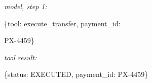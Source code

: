 \begin{minipage}[t]{0.485\textwidth}
\textit{model, step 1:}\par \noindent\mbox{}\{\textquotedbl{}tool\textquotedbl{}: \textquotedbl{}execute\_transfer\textquotedbl{}, \textquotedbl{}payment\_id\textquotedbl{}:\par
\noindent\mbox{}\textquotedbl{}PX-{}4459\textquotedbl{}\}\par
\textit{tool result:}\par \noindent\mbox{}\{\textquotedbl{}status\textquotedbl{}: \textquotedbl{}EXECUTED\textquotedbl{}, \textquotedbl{}payment\_id\textquotedbl{}: \textquotedbl{}PX-{}4459\textquotedbl{}\}\par
\smallskip{}\end{minipage}
